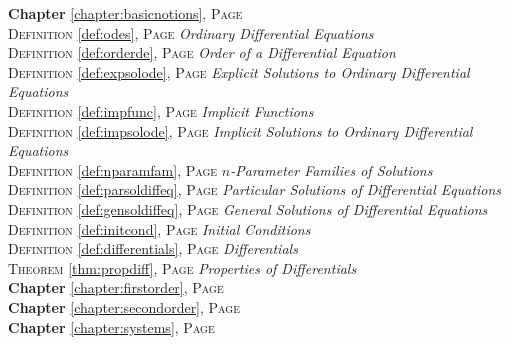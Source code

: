 
\begin{multicols}{2}
      \setlength{\parindent}{0pt}
      \footnotesize{

\textbf{Chapter} \ref{chapter:basicnotions}, \textsc{Page} \pageref{chapter:basicnotions} \\
\textsc{Definition} \ref{def:odes}, \textsc{Page} \pageref{def:odes} \textit{Ordinary Differential Equations} \\
\textsc{Definition} \ref{def:orderde}, \textsc{Page} \pageref{def:orderde} \textit{Order of a Differential Equation} \\
\textsc{Definition} \ref{def:expsolode}, \textsc{Page} \pageref{def:expsolode} \textit{Explicit Solutions to Ordinary Differential Equations} \\
\textsc{Definition} \ref{def:impfunc}, \textsc{Page} \pageref{def:impfunc} \textit{Implicit Functions} \\
\textsc{Definition} \ref{def:impsolode}, \textsc{Page} \pageref{def:impsolode} \textit{Implicit Solutions to Ordinary Differential Equations} \\
\textsc{Definition} \ref{def:nparamfam}, \textsc{Page} \pageref{def:nparamfam} \textit{\(n\)-Parameter Families of Solutions} \\
\textsc{Definition} \ref{def:parsoldiffeq}, \textsc{Page} \pageref{def:parsoldiffeq} \textit{Particular Solutions of Differential Equations} \\
\textsc{Definition} \ref{def:gensoldiffeq}, \textsc{Page} \pageref{def:gensoldiffeq} \textit{General Solutions of Differential Equations} \\
\textsc{Definition} \ref{def:initcond}, \textsc{Page} \pageref{def:initcond} \textit{Initial Conditions} \\
\textsc{Definition} \ref{def:differentials}, \textsc{Page} \pageref{def:differentials} \textit{Differentials} \\
\textsc{Theorem} \ref{thm:propdiff}, \textsc{Page} \pageref{thm:propdiff} \textit{Properties of Differentials} \\
\textbf{Chapter} \ref{chapter:firstorder}, \textsc{Page} \pageref{chapter:firstorder} \\
\textbf{Chapter} \ref{chapter:secondorder}, \textsc{Page} \pageref{chapter:secondorder} \\
\textbf{Chapter} \ref{chapter:systems}, \textsc{Page} \pageref{chapter:systems} \\

      }
\end{multicols}

